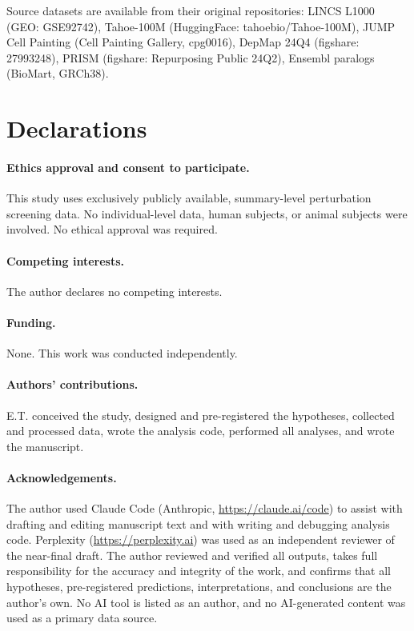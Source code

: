\documentclass[11pt]{article}
\begin{document}
Source datasets are available from their original repositories: LINCS
L1000 (GEO: GSE92742), Tahoe-100M (HuggingFace: tahoebio/Tahoe-100M),
JUMP Cell Painting (Cell Painting Gallery, cpg0016), DepMap 24Q4
(figshare: 27993248), PRISM (figshare: Repurposing Public 24Q2),
Ensembl paralogs (BioMart, GRCh38).

\section*{Declarations}

\paragraph{Ethics approval and consent to participate.}
This study uses exclusively publicly available, summary-level perturbation screening data. No individual-level data, human subjects, or animal subjects were involved. No ethical approval was required.

\paragraph{Competing interests.}
The author declares no competing interests.

\paragraph{Funding.}
None. This work was conducted independently.

\paragraph{Authors' contributions.}
E.T. conceived the study, designed and pre-registered the hypotheses, collected and processed data, wrote the analysis code, performed all analyses, and wrote the manuscript.

\paragraph{Acknowledgements.}
The author used Claude Code (Anthropic, \url{https://claude.ai/code}) to assist with drafting and editing manuscript text and with writing and debugging analysis code. Perplexity (\url{https://perplexity.ai}) was used as an independent reviewer of the near-final draft. The author reviewed and verified all outputs, takes full responsibility for the accuracy and integrity of the work, and confirms that all hypotheses, pre-registered predictions, interpretations, and conclusions are the author's own. No AI tool is listed as an author, and no AI-generated content was used as a primary data source.
\end{document}
